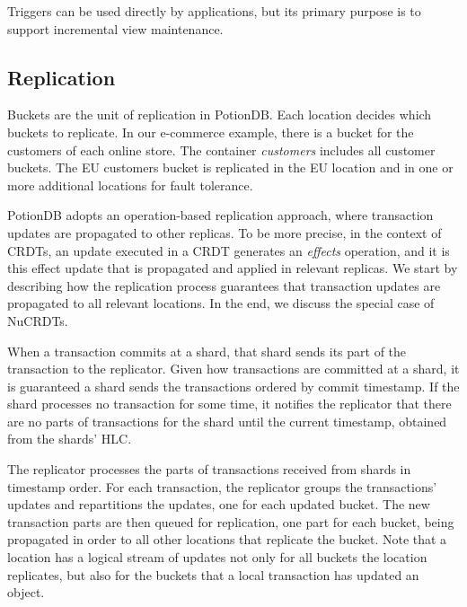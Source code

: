 \documentclass[sigplan,twocolumn,review,anonymous]{acmart}
\begin{document}
Triggers can be used directly by applications, but its primary purpose is to support
incremental view maintenance.%

\subsection{Replication}
\label{sec:replication}

Buckets are the unit of replication in PotionDB.  Each location decides which buckets to replicate.
In our e-commerce example, there is a bucket for 
the customers of each online store.  The container \emph{customers} includes all customer buckets.
The EU customers bucket is  replicated in the EU location and
in one or more additional locations for fault tolerance.

PotionDB adopts an operation-based replication approach, where transaction updates 
are propagated to other replicas. To be more precise, in the context of CRDTs, an update
executed in a CRDT generates an \emph{effects} operation, and it is this effect update that is
propagated and applied in relevant replicas. We start by describing how the replication process
guarantees that transaction updates are propagated to all relevant locations. In the end, 
we discuss the special case of NuCRDTs.

When a transaction commits at a shard, that shard sends its part of the transaction to the replicator.  
Given how transactions are committed at a shard, it is guaranteed a shard sends the transactions
ordered by commit timestamp.
If the shard processes no transaction for some time, it notifies the replicator that there are
no parts of transactions for the shard until the current timestamp, obtained from the shards' HLC.

The replicator processes the parts of transactions received from shards in timestamp order. 
For each transaction, the replicator groups the transactions' updates and repartitions the
updates, one for each updated bucket. The new transaction parts are then queued 
for replication, one part for each bucket, being propagated in order to all other locations that 
replicate the bucket. 
Note that a location has a logical stream of updates not only for all buckets the location replicates,
but also for the buckets that a local transaction has updated an object.
\end{document}

